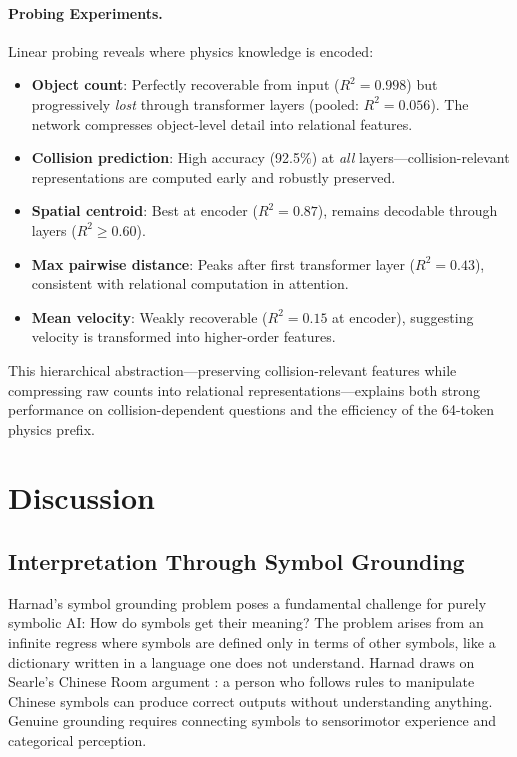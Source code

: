 \documentclass[conference]{IEEEtran}
\theoremstyle{plain}
\theoremstyle{definition}
\theoremstyle{remark}
\begin{document}
\paragraph{Probing Experiments.} Linear probing reveals where physics knowledge is encoded:
\begin{itemize}[nosep,leftmargin=*]
    \item \textbf{Object count}: Perfectly recoverable from input ($R^2=0.998$) but progressively \emph{lost} through transformer layers (pooled: $R^2=0.056$). The network compresses object-level detail into relational features.
    \item \textbf{Collision prediction}: High accuracy (92.5\%) at \emph{all} layers---collision-relevant representations are computed early and robustly preserved.
    \item \textbf{Spatial centroid}: Best at encoder ($R^2=0.87$), remains decodable through layers ($R^2 \geq 0.60$).
    \item \textbf{Max pairwise distance}: Peaks after first transformer layer ($R^2=0.43$), consistent with relational computation in attention.
    \item \textbf{Mean velocity}: Weakly recoverable ($R^2=0.15$ at encoder), suggesting velocity is transformed into higher-order features.
\end{itemize}
This hierarchical abstraction---preserving collision-relevant features while compressing raw counts into relational representations---explains both strong performance on collision-dependent questions and the efficiency of the 64-token physics prefix.

\section{Discussion}
\label{sec:discussion}

\subsection{Interpretation Through Symbol Grounding}

Harnad's symbol grounding problem \cite{harnad1990symbol} poses a fundamental challenge for purely symbolic AI: How do symbols get their meaning? The problem arises from an infinite regress where symbols are defined only in terms of other symbols, like a dictionary written in a language one does not understand. Harnad draws on Searle's Chinese Room argument \cite{searle1980minds}: a person who follows rules to manipulate Chinese symbols can produce correct outputs without understanding anything. Genuine grounding requires connecting symbols to sensorimotor experience and categorical perception.
\end{document}
